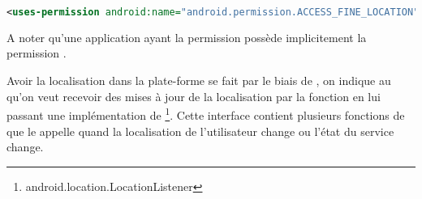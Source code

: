 \begin{lstlisting}[language=xml, caption=Permission pour la localisation par GPS.]
<uses-permission android:name="android.permission.ACCESS_FINE_LOCATION"/>
\end{lstlisting}

A noter qu'une application ayant la permission  possède implicitement la permission .

Avoir la localisation dans la plate-forme \android{} se fait par le biais de
, on indique au  qu'on veut recevoir des mises
à jour de la localisation par la fonction  en lui
passant une implémentation de
\footnote{android.location.LocationListener}. Cette
interface contient plusieurs fonctions de  que le
 appelle quand la localisation de l'utilisateur change ou
l'état du service change\cite{guide:location_strategies}.
